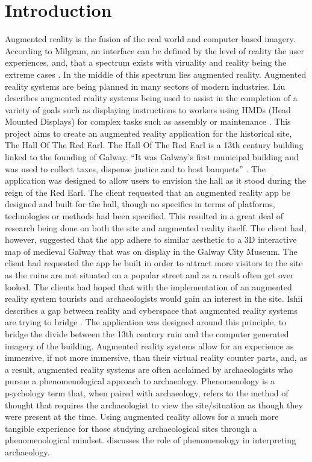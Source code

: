 \chapter{Introduction}
Augmented reality is the fusion of the real world and computer based imagery. According to Milgram, an interface can be defined by the level of reality the user experiences, and, that a spectrum exists with viruality and reality being the extreme cases \cite{SPIE}.
In the middle of this spectrum lies augmented reality. Augmented reality systems are being planned in many sectors of modern industries. Liu describes augmented reality systems being used to assist in the completion of a variety of goals such as displaying instructions to workers using HMDs (Head Mounted Displays) for complex tasks such as assembly or maintenance \cite{SIGCHI}.
This project aims to create an augmented reality application for the historical site, The Hall Of The Red Earl.
The Hall Of The Red Earl is a 13th century building linked to the founding of Galway. “It was Galway’s first municipal building and was used to collect taxes, dispense justice and to host banquets” \cite{dng}. The application was designed to allow users to envision the hall as it stood during the reign of the Red Earl.
The client requested that an augmented reality app be designed and built for the hall, though no specifics in terms of platforms, technologies or methods had been specified. This resulted in a great deal of research being done on both the site and augmented reality itself. The client had, however, suggested that the app adhere to similar aesthetic to a 3D interactive map of medieval Galway that was on display in the Galway City Museum. The client had requested the app be built in order to attract more visitors to the site as the ruins are not situated on a popular street and as a result often get over looked. The clients had hoped that with the implementation of an augmented reality system tourists and archaeologists would gain an interest in the site.
Ishii describes a gap between reality and cyberspace that augmented reality systems are trying to bridge \cite{tangibleBits}. The application was designed around this principle, to bridge the divide between the 13th century ruin and the computer generated imagery of the building. Augmented reality systems allow for an experience as immersive, if not more immersive, than their virtual reality counter parts, and, as a result, augmented reality systems are often acclaimed by archaeologists who pursue a phenomenological approach to archaeology. Phenomenology is a psychology term that, when paired with archaeology, refers to the method of thought that requires the archaeologist to view the site/situation as though they were present at the time. Using augmented reality allows for a much more tangible experience for those studying archaeological sites through a phenomenological mindset.\cite{tilley} discusses the role of phenomenology in interpreting archaeology.

